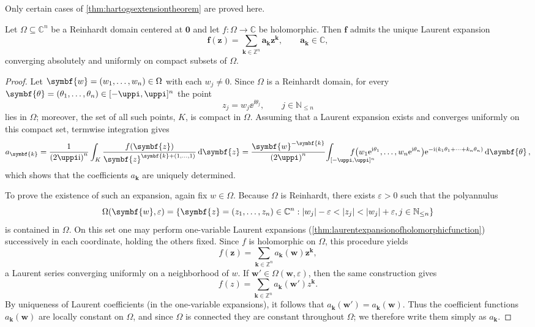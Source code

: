 Only certain cases of \cref{thm:hartogsextensiontheorem} are proved here.
\begin{proposition}\label{prop:reinhardtlaurentexpansion}
    Let \(\Omega\subseteq\mathbb{C}^n\) be a Reinhardt domain centered at \(\symbf{0}\) and let \(f:\Omega\to\mathbb{C}\) be holomorphic. Then \(\symbf{f}\) admits the unique Laurent expansion
    \begin{equation}
        \symbf{f}(\symbf{z})=\sum_{\symbf{k}\in\mathbb{Z}^n}\symbf{a}_{\symbf{k}}\symbf{z}^{\symbf{k}},\qquad\symbf{a}_{\symbf{k}}\in\mathbb{C},\label{eq:reinhardtlaurentexpansion}
    \end{equation} converging absolutely and uniformly on compact subsets of \(\Omega\).
\end{proposition}
\begin{proof}
    Let \(\symbf{w}=\qty(w_1,\dots,w_n)\in\Omega\) with each \(w_j\neq0\). Since \(\Omega\) is a Reinhardt domain, for every \(\symbf{\theta}=\qty(\theta_1,\dots,\theta_n)\in[-\uppi,\uppi]^n\) the point
    \[z_j=w_j\ee^{\ii\theta_j},\qquad j\in\mathbb{N}_{\leq n}\]
    lies in \(\Omega\); moreover, the set of all such points, \(K\), is compact in
    \(\Omega\). Assuming that a Laurent expansion exists and converges uniformly on
    this compact set, termwise integration gives
    \[a_{\symbf{k}}=\frac{1}{\qty(2\uppi\ii)^n}\int_K\frac{f(\symbf{z})}{\symbf{z}^{\symbf{k}+\qty(1,\dots,1)}}\dd{\symbf{z}}=\frac{\symbf{w}^{-\symbf{k}}}{\qty(2\uppi)^n}\mathmakebox[\widthof{\(\int_{-\uppi}\)}][l]{\int_{[-\uppi,\uppi]^n}}
    f\qty(w_1\ee^{\ii\theta_1},\dots,w_n\ee^{\ii\theta_n})\ee^{-\ii(k_1\theta_1+\cdots+k_n\theta_n)}\dd{\symbf{\theta}},\]
    which shows that the coefficients \(a_{\symbf{k}}\) are uniquely determined.

    To prove the existence of such an expansion, again fix \(w\in\Omega\). Because
    \(\Omega\) is Reinhardt, there exists \(\varepsilon>0\) such that the
    polyannulus
    \[\Omega\qty(\symbf{w},\varepsilon)=\cbraces{\symbf{z}=\qty(z_1,\dots,z_n)\in\mathbb{C}^n}{\abs{w_j}-\varepsilon<\abs{z_j}<\abs{w_j}+\varepsilon,j\in\mathbb{N}_{\leq n}}\] is contained in \(\Omega\). On this set one may perform one-variable Laurent
    expansions (\cref{thm:laurentexpansionofholomorphicfunction}) successively in
    each coordinate, holding the others fixed. Since \(f\) is holomorphic on
    \(\Omega\), this procedure yields
    \[f(\symbf{z})=\sum_{\symbf{k}\in\mathbb{Z}^n}a_{\symbf{k}}(\symbf{w})\symbf{z}^{\symbf{k}},\]
    a Laurent series converging uniformly on a neighborhood of \(w\). If
    \(\symbf{w}'\in\Omega(\symbf{w},\varepsilon)\), then the same construction gives
    \[f(z)=\sum_{\symbf{k}\in\mathbb{Z}^n}a_{\symbf{k}}(\symbf{w}')z^{\symbf{k}}.\]
    By uniqueness of Laurent coefficients (in the one-variable expansions), it
    follows that \(a_{\symbf{k}}(\symbf{w}')=a_{\symbf{k}}(\symbf{w})\). Thus the
    coefficient functions \(a_{\symbf{k}}(\symbf{w})\) are locally constant on
    \(\Omega\), and since \(\Omega\) is connected they are constant throughout
    \(\Omega\); we therefore write them simply as \(a_{\symbf{k}}\).


\end{proof}
